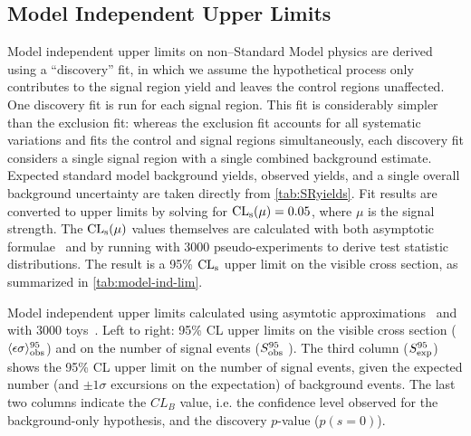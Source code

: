 \clearpage

\subsection{Model Independent Upper Limits}
\label{sec:model-independent-ul}

Model independent upper limits on non--Standard Model physics are
derived using a ``discovery'' fit, in which we assume the hypothetical
process only contributes to the signal region yield and leaves the
control regions unaffected. One discovery fit is run for each signal
region. This fit is considerably simpler than the exclusion fit:
whereas the exclusion fit accounts for all systematic variations and
fits the control and signal regions simultaneously, each discovery fit
considers a single signal region with a single combined background
estimate. Expected standard model background yields, observed yields,
and a single overall background uncertainty are taken directly from
\cref{tab:SRyields}. Fit results are converted to upper limits by
solving for $\mathrm{CL}_{\mathrm{s}}(\mu) = 0.05$, where $\mu$ is the signal
strength. The $\mathrm{CL}_{\mathrm{s}}(\mu)$ values themselves are calculated with both
asymptotic formulae~\cite{asymptotics} and by running with 3000
pseudo-experiments to derive test statistic distributions.  The result
is a 95\% $\mathrm{CL}_{\mathrm{s}}$ upper limit on the visible cross section, as summarized
in \cref{tab:model-ind-lim}.

\begin{table}
\centering
{}
\caption[Breakdown of model independent upper limits]{
Model independent upper limits calculated using asymtotic approximations~ and with 3000 toys~. Left to right: 95\% CL upper limits on the visible cross section
($\langle\epsilon\sigma\rangle_{\rm obs}^{95}$) and on the number of
signal events ($S_{\rm obs}^{95}$ ).  The third column
($S_{\rm exp}^{95}$) shows the 95\% CL upper limit on the number of
signal events, given the expected number (and $\pm 1\sigma$
excursions on the expectation) of background events.
The last two columns
indicate the $CL_B$ value, i.e. the confidence level observed for
the background-only hypothesis, and the discovery $p$-value ($p(s = 0)$).}
\label{tab:model-ind-lim}
\end{table}



